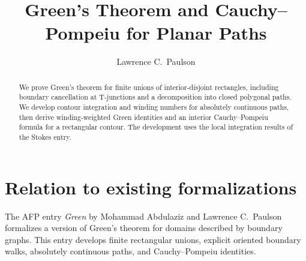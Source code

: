 \documentclass[11pt,a4paper]{article}
\begin{document}
\title{Green's Theorem and Cauchy--Pompeiu for Planar Paths}
\author{Lawrence C.\ Paulson}
\maketitle

\begin{abstract}
We prove Green's theorem for finite unions of interior-disjoint rectangles,
including boundary cancellation at T-junctions and a decomposition into
closed polygonal paths. We develop contour integration and winding numbers
for absolutely continuous paths, then derive winding-weighted Green identities
and an interior Cauchy--Pompeiu formula for a rectangular contour.
The development uses the local integration results of the Stokes entry.
\end{abstract}

\section{Relation to existing formalizations}
The AFP entry \emph{Green} by Mohammad Abdulaziz and Lawrence C.\ Paulson
formalizes a version of Green's theorem for domains described by boundary
graphs. This entry develops finite rectangular unions, explicit oriented
boundary walks, absolutely continuous paths, and Cauchy--Pompeiu identities.


\end{document}
